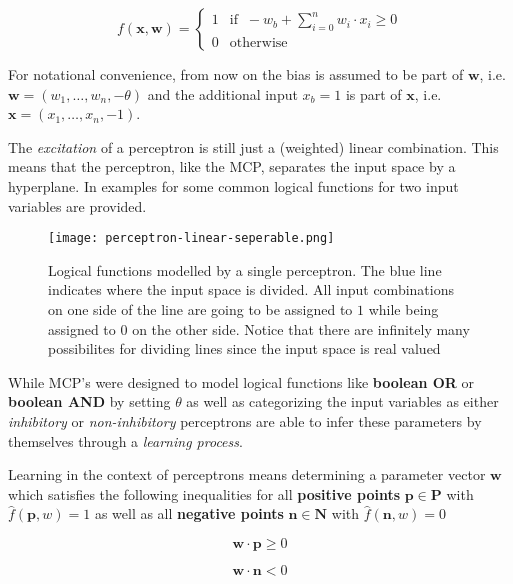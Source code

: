 \begin{equation}
    \label{eq:full-perceptron}
    f(\bm{x}, \bm{w}) = 
    \begin{cases}
        1 & \text{if } ~ -w_b + \sum_{i=0}^n w_i \cdot x_i \geq 0 \\
        0 & \text{otherwise}
    \end{cases}    
\end{equation}

For notational convenience, from now on the bias is assumed to be part of $\bm{w}$, i.e. $\bm{w} = (w_1, \dots, w_n, -\theta)$ and the additional input $x_b = 1$ is part of $\bm{x}$, i.e. $\bm{x} = (x_1, \dots, x_n, -1)$.

The \textit{excitation} of a perceptron is still just a (weighted) linear combination.
This means that the perceptron, like the MCP, separates the input space by a hyperplane.
In  examples for some common logical functions for two input variables are provided.

\begin{figure}[htb!]
    \texttt{[image: perceptron-linear-seperable.png]}
    \caption{Logical functions modelled by a single perceptron. The blue line indicates where the input space is divided. All input combinations on one side of the line are going to be assigned to $1$ while being assigned to $0$ on the other side. Notice that there are infinitely many possibilites for dividing lines since the input space is real valued \cite{rudolph_lecture_2018}}
    \label{fig:perceptron-logic}
\end{figure}

While MCP's were designed to model logical functions like \textbf{boolean OR} or \textbf{boolean AND} by setting $\theta$ as well as categorizing the input variables as either \textit{inhibitory} or \textit{non-inhibitory} perceptrons are able to infer these parameters by themselves through a \textit{learning process}.

Learning in the context of perceptrons means determining a parameter vector $\bm{w}$ which satisfies the following inequalities for all \textbf{positive points} $\bm{p} \in \bm{P}$ with $\hat{f}(\bm{p}, w) = 1$ as well as all \textbf{negative points} $\bm{n} \in \bm{N}$ with $\hat{f}(\bm{n}, w) = 0$

\begin{equation}
    \bm{w} \cdot \bm{p} \geq 0
\end{equation}

\begin{equation}
    \bm{w} \cdot \bm{n} < 0
\end{equation}

